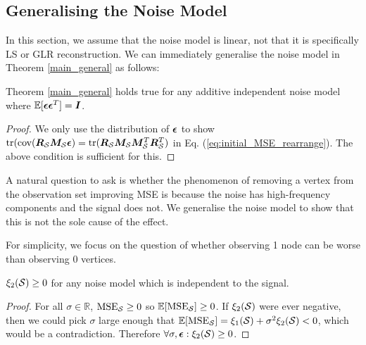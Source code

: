 {\iffalse
\subsection{Generalising the Noise Model}
In this section, we assume that the noise model is linear, not that it is specifically LS or GLR reconstruction. 
We can immediately generalise the noise model in Theorem \ref{main_general} as follows:

\begin{remark}
    Theorem \ref{main_general} holds true for any additive independent noise model where $\mathbb{E}[\bm{\epsilon}\bm{\epsilon}^{T}] = \bm{I}$.
\end{remark}
\begin{proof}
    We only use the distribution of $\bm{\epsilon}$ to show $\textrm{tr}(\textrm{cov}(\bm{R}_{\mathcal{S}}\bm{M}_{\mathcal{S}}\bm{\epsilon}) = \textrm{tr}(\bm{R}_{\mathcal{S}}\bm{M}_{\mathcal{S}}     \bm{M}_{\mathcal{S}}^{T} \bm{R}_{\mathcal{S}}^{T})$ in Eq. (\ref{eq:initial_MSE_rearrange}). The above condition is sufficient for this.
\end{proof}

A natural question to ask is whether the phenomenon of removing a vertex from the observation set improving MSE is because the noise has high-frequency components and the signal does not. We generalise the noise model to show that this is not the sole cause of the effect.

For simplicity, we focus on the question of whether observing 1 node can be worse than observing 0 vertices.


\begin{lemma}
    $\xi_{2}(\mathcal{S}) \geq 0$ for any noise model which is independent to the signal.
\end{lemma}
\begin{proof}
    For all $\sigma \in \mathbb{R}$, $\textrm{MSE}_{\mathcal{S}} \geq 0$ so $\mathbb{E}[\textrm{MSE}_{\mathcal{S}}] \geq 0$. If $\xi_{2}(\mathcal{S})$ were ever negative, then we could pick $\sigma$ large enough that $\mathbb{E}[\textrm{MSE}_{\mathcal{S}}]  = \xi_{1}(\mathcal{S}) + \sigma^{2} \xi_{2}(\mathcal{S}) <0$, which would be a contradiction. Therefore $\forall \sigma, \bm{\epsilon}: \xi_{2}(\mathcal{S}) \geq 0$.

\end{proof}

}
